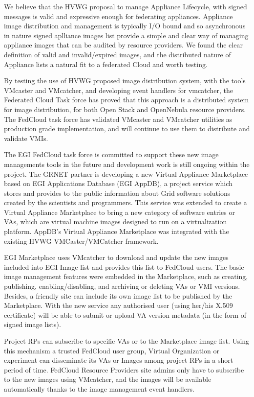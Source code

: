 \documentclass{cai}
\begin{document}
We believe that the HVWG proposal to manage Appliance Lifecycle, with signed messages is valid and expressive enough for federating appliances. 
Appliance image distribution and management is typically I/O bound and so asynchronous in nature signed aplliance images list provide a simple and clear way of managing appliance images that can be audited by resource providers. 
We found the clear definition of valid and invalid/expired images, and the distributed nature of Appliance lists a natural fit to a federated Cloud and worth testing.

By testing the use of HVWG proposed image distribution system, with the tools VMcaster and VMcatcher, and developing event handlers for vmcatcher, the Federated Cloud Task force has proved that this approach is a distributed system for image distribution, for both Open Stack and OpenNebula resource providers. 
The FedCloud task force has validated VMcaster and VMcatcher utilities as production grade implementation, and will continue to use them to distribute and validate VMIs.

The EGI FedCloud task force is committed to support these new image managements tools in the future and development work is still ongoing within the project. 
The GRNET partner is developing a new Virtual Appliance Marketplace based on EGI Applications Database (EGI AppDB), a project service which stores and provides to the public information about Grid software solutions created by the scientists and programmers.
This service was extended to create a Virtual Appliance Marketplace to bring a new category of software entries or VAs, which are virtual machine images designed to run on a virtualization platform.
AppDB's Virtual Appliance Marketplace was integrated with the existing HVWG VMCaster/VMCatcher framework.

EGI Marketplace uses VMcatcher to download and update the new images included into EGI Image list and provides this list to FedCloud users.  
The basic image management features were embedded in the Marketplace, such as creating, publishing, enabling/disabling, and archiving or deleting VAs or VMI versions.
Besides, a friendly site can include its own image list to be published by the Marketplace. 
With the new service any authorised user (using her/his X.509 certificate) will be able to submit or upload VA version metadata (in the form of signed image lists).
 
Project RPs can subscribe to specific VAs or to the Marketplace image list. Using this mechanism a trusted FedCloud user group, Virtual Organization or experiment can disseminate its VAs or Images among project RPs in a short period of time.
FedCloud Resource Providers site admins only have to subscribe to the new images using VMcatcher, and the images will be available automatically thanks to the image management event handlers.
\end{document}
